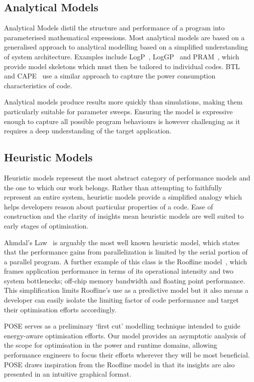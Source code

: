 \subsection{Analytical Models} 
Analytical Models distil the structure and performance of a program into parameterised mathematical expressions.
Most analytical models are based on a generalised approach to analytical modelling based on a simplified understanding of system architecture.
Examples include LogP~\cite{culler:1993aa}, LogGP~\cite{alexandrov:1997aa} and PRAM~\cite{karp:1991aa}, which provide model skeletons which must then be tailored to individual codes.
BTL~\cite{manousakis:2012aa} and CAPE~\cite{kamble:1997aa} use a similar approach to capture the power consumption characteristics of code. 

Analytical models produce results more quickly than simulations, making them particularly suitable for parameter sweeps.
Ensuring the model is expressive enough to capture all possible program behaviours is however challenging as it requires a deep understanding of the target application.

\subsection{Heuristic Models}
Heuristic models represent the most abstract category of performance models and the one to which our work belongs.
Rather than attempting to faithfully represent an entire system, heuristic models provide a simplified analogy which helps developers reason about particular properties of a code.
Ease of construction and the clarity of insights mean heuristic models are well suited to early stages of optimisation.

Ahmdal's Law~\cite{amdahl:1967aa} is arguably the most well known heuristic model, which states that the performance gains from parallelization is limited by the serial portion of a parallel program.
A further example of this class is the Roofline model~\cite{williams:2009aa}, which frames application performance in terms of its operational intensity and two system bottlenecks; off-chip memory bandwidth and floating point performance.
This simplification limits Roofline's use as a predictive model but it also means a developer can easily isolate the limiting factor of code performance and target their optimisation efforts accordingly.

POSE serves as a preliminary `first cut' modelling technique intended to guide energy-aware optimisation efforts.
Our model provides an asymptotic analysis of the scope for optimisation in the power and runtime domains, allowing performance engineers to focus their efforts wherever they will be most beneficial.
POSE draws inspiration from the Roofline model in that its insights are also presented in an intuitive graphical format.

